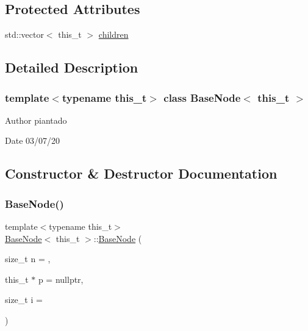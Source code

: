 \subsection*{Protected Attributes}
\begin{DoxyCompactItemize}
\item 
std\+::vector$<$ this\+\_\+t $>$ \hyperlink{class_base_node_af2f245862083d173c950fca048c03546}{children}
\end{DoxyCompactItemize}


\subsection{Detailed Description}
\subsubsection*{template$<$typename this\+\_\+t$>$\newline
class Base\+Node$<$ this\+\_\+t $>$}

\begin{DoxyAuthor}{Author}
piantado 
\end{DoxyAuthor}
\begin{DoxyDate}{Date}
03/07/20 
\end{DoxyDate}


\subsection{Constructor \& Destructor Documentation}
\mbox{\label{class_base_node_ae6af9c22d332e9c3158d9467f77b59f7}} 
\subsubsection{\texorpdfstring{Base\+Node()}{BaseNode()}\hspace{0.1cm}{\footnotesize\ttfamily [1/3]}}
{\footnotesize\ttfamily template$<$typename this\+\_\+t$>$ \\
\hyperlink{class_base_node}{Base\+Node}$<$ this\+\_\+t $>$\+::\hyperlink{class_base_node}{Base\+Node} (\begin{DoxyParamCaption}\item[{size\+\_\+t}]{n = {},  }\item[{this\+\_\+t $\ast$}]{p = {\ttfamily nullptr},  }\item[{size\+\_\+t}]{i = {} }\end{DoxyParamCaption})\hspace{0.3cm}{\ttfamily [inline]}}



